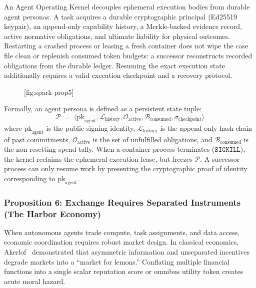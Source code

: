 \documentclass[11pt,a4paper]{article}
\providecommand{\pdchapref}[2]{\textbf{#2}}
\begin{document}
An Agent Operating Kernel decouples ephemeral execution bodies from durable agent personas. A task acquires a durable cryptographic principal (Ed25519 keypair), an append-only capability history, a Merkle-backed evidence record, active normative obligations, and ultimate liability for physical outcomes. Restarting a crashed process or leasing a fresh container does not wipe the case file clean or replenish consumed token budgets: a successor reconstructs recorded obligations from the durable ledger. Resuming the exact execution state additionally requires a valid execution checkpoint and a recovery protocol.

\begin{figure}[tp]
  \centering
  [fig:spark-prop5]
\end{figure}

Formally, an agent persona is defined as a persistent state tuple:
\begin{equation}
\mathcal{P} \;=\; \langle \mathrm{pk}_{\text{agent}}, \mathcal{L}_{\text{history}}, \mathcal{O}_{\text{active}}, \mathcal{B}_{\text{consumed}}, \sigma_{\text{checkpoint}} \rangle
\end{equation}
where $\mathrm{pk}_{\text{agent}}$ is the public signing identity, $\mathcal{L}_{\text{history}}$ is the append-only hash chain of past commitments, $\mathcal{O}_{\text{active}}$ is the set of unfulfilled obligations, and $\mathcal{B}_{\text{consumed}}$ is the non-resetting spend tally. When a container process terminates ($\mathtt{SIGKILL}$), the kernel reclaims the ephemeral execution lease, but freezes $\mathcal{P}$. A successor process can only resume work by presenting the cryptographic proof of identity corresponding to $\mathrm{pk}_{\text{agent}}$.

\subsubsection*{Proposition 6: Exchange Requires Separated Instruments (\pdchapref{he}{The Harbor Economy})}
When autonomous agents trade compute, task assignments, and data access, economic coordination requires robust market design. In classical economics, Akerlof~ demonstrated that asymmetric information and unseparated incentives degrade markets into a ``market for lemons.'' Conflating multiple financial functions into a single scalar reputation score or omnibus utility token creates acute moral hazard.
\end{document}
